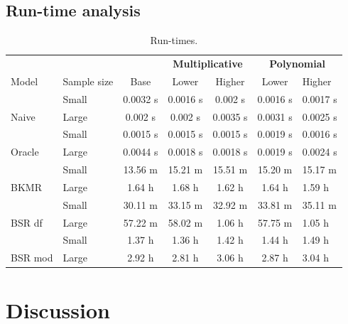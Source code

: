 \documentclass[12pt, twoside]{amherstthesis}
\begin{document}
\hypertarget{run-time-analysis}{%
\subsection{Run-time analysis}\label{run-time-analysis}}
\begin{table}

\caption{\label{tab:runtimes}Run-times.}
\centering
\begin{tabular}[t]{llccccl}
\toprule
\multicolumn{3}{c}{\textbf{ }} & \multicolumn{2}{c}{\textbf{Multiplicative}} & \multicolumn{2}{c}{\textbf{Polynomial}} \\
\cmidrule(l{3pt}r{3pt}){4-5} \cmidrule(l{3pt}r{3pt}){6-7}
Model & Sample size & Base & Lower & Higher & Lower & Higher\\
\midrule
 & Small & 0.0032 s & 0.0016 s & 0.002 s & 0.0016 s & 0.0017 s\\

\multirow{-2}{*}{\raggedright\arraybackslash Naive} & Large & 0.002 s & 0.002 s & 0.0035 s & 0.0031 s & 0.0025 s\\
\addlinespace
 & Small & 0.0015 s & 0.0015 s & 0.0015 s & 0.0019 s & 0.0016 s\\

\multirow{-2}{*}{\raggedright\arraybackslash Oracle} & Large & 0.0044 s & 0.0018 s & 0.0018 s & 0.0019 s & 0.0024 s\\
\addlinespace
 & Small & 13.56 m & 15.21 m & 15.51 m & 15.20 m & 15.17 m\\

\multirow{-2}{*}{\raggedright\arraybackslash BKMR} & Large & 1.64 h & 1.68 h & 1.62 h & 1.64 h & 1.59 h\\
\addlinespace
 & Small & 30.11 m & 33.15 m & 32.92 m & 33.81 m & 35.11 m\\

\multirow{-2}{*}{\raggedright\arraybackslash BSR df} & Large & 57.22 m & 58.02 m & 1.06 h & 57.75 m & 1.05 h\\
\addlinespace
 & Small & 1.37 h & 1.36 h & 1.42 h & 1.44 h & 1.49 h\\

\multirow{-2}{*}{\raggedright\arraybackslash BSR mod} & Large & 2.92 h & 2.81 h & 3.06 h & 2.87 h & 3.04 h\\
\bottomrule
\end{tabular}
\end{table}
\hypertarget{discussion}{%
\section{Discussion}\label{discussion}}
\end{document}

